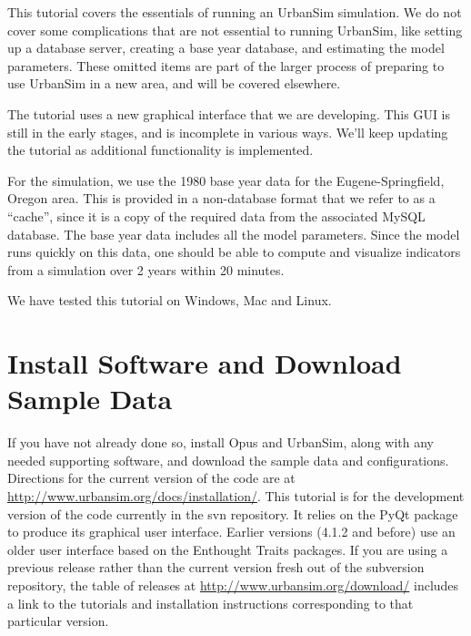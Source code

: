 \documentclass{howto}
\begin{document}
This tutorial covers the essentials of running an UrbanSim simulation.
We do not cover some complications that are not essential to running
UrbanSim, like setting up a database server, creating a base year database, and
estimating the model parameters.  These omitted items are part of the larger
process of preparing to use UrbanSim in a new area, and will be covered
elsewhere.

The tutorial uses a new graphical interface that we are developing.  This
GUI is still in the early stages, and is incomplete in various ways.  We'll
keep updating the tutorial as additional functionality is implemented.

For the simulation, we use the 1980 base year data for the
Eugene-Springfield, Oregon area.  This is provided in a non-database
format that we refer to as a ``cache'', since it is a copy of the
required data from the associated MySQL database. The base year data
includes all the model parameters.  Since the model runs quickly on this data, one should be able to
compute and visualize indicators from a simulation over 2 years
within 20 minutes.

We have tested this tutorial on Windows, Mac and Linux.

\section*{Install Software and Download Sample Data}

If you have not already done so, install Opus and UrbanSim, along with
any needed supporting software, and download the sample data and configurations.  
Directions for the current version of
the code are at \url{http://www.urbansim.org/docs/installation/}.  
This tutorial is for the development version of the code currently in 
the svn repository.    It relies on the PyQt package to produce its 
graphical user interface. Earlier versions (4.1.2 and before) use an
older user interface based on the Enthought Traits packages.  If
you are using a previous release rather than the current
version fresh out of the subversion repository, the table of releases
at \url{http://www.urbansim.org/download/} includes a link to the 
tutorials and installation
instructions corresponding to that particular version.

\end{document}
